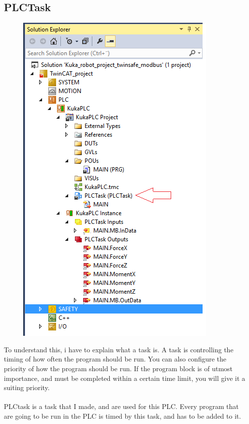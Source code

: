 \documentclass{article}
\begin{document}
\subsection{PLCTask}
\begin{figure}[!h]
    \centering
    \includegraphics[scale=0.7]{pictures/TC3_PLCTask.png}
    \caption{}
    \label{fig:my_label}
\end{figure}

To understand this, i have to explain what a task is. A task is controlling the timing of how often the program should be run. You can also configure the priority of how the program should be run. If the program block is of utmost importance, and must be completed within a certain time limit, you will give it a suiting priority. 
\\
\\
PLCtask is a task that I made, and are used for this PLC. Every program that are going to be run in the PLC is timed by this task, and has to be added to it. 
\end{document}
